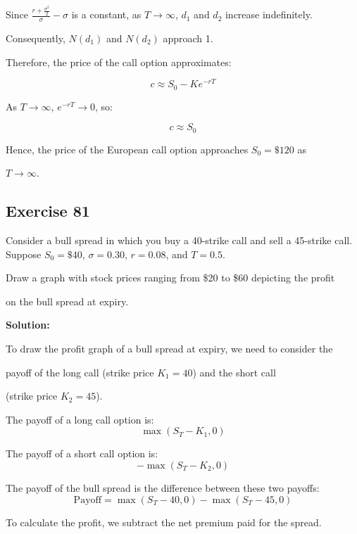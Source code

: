 \documentclass{article}
\begin{document}
Since \( \frac{r + \frac{\sigma^2}{2}}{\sigma} - \sigma \) is a constant, as \( T \to \infty \), \( d_1 \) and \( d_2 \) increase indefinitely. 

\vspace{\baselineskip}

Consequently, \( N(d_1) \) and \( N(d_2) \) approach 1.

\vspace{\baselineskip}

Therefore, the price of the call option approximates:

\[
c \approx S_0 - K e^{-rT}
\]

As \( T \to \infty \), \( e^{-rT} \to 0 \), so:

\[
c \approx S_0
\]

Hence, the price of the European call option approaches \( S_0 = \$120 \) as 

\( T \to \infty \).

\subsection*{Exercise 81}

Consider a bull spread in which you buy a 40-strike call and sell a 45-strike call. Suppose \( S_0 = \$40 \), \( \sigma = 0.30 \), \( r = 0.08 \), and \( T = 0.5 \).

\vspace{\baselineskip}

\noindent Draw a graph with stock prices ranging from \$20 to \$60 depicting the profit 

on the bull spread at expiry.

\textbf{Solution:}

To draw the profit graph of a bull spread at expiry, we need to consider the 

payoff of the long call (strike price \( K_1 = 40 \)) and the short call 

(strike price \( K_2 = 45 \)).

\vspace{\baselineskip}

The payoff of a long call option is:
\[
\max(S_T - K_1, 0)
\]

The payoff of a short call option is:
\[
-\max(S_T - K_2, 0)
\]

The payoff of the bull spread is the difference between these two payoffs:
\[
\text{Payoff} = \max(S_T - 40, 0) - \max(S_T - 45, 0)
\]

To calculate the profit, we subtract the net premium paid for the spread.
\end{document}
